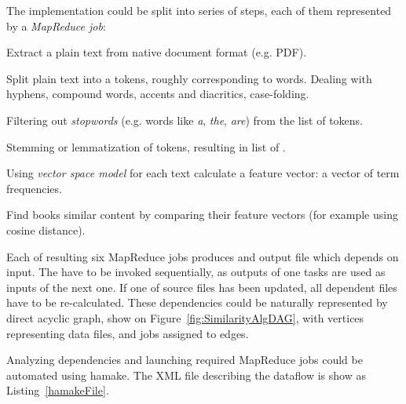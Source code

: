 \documentclass[10pt,conference,letterpaper]{IEEEtran}
\begin{document}
The implementation could be split into series of steps, each of them
represented by a \textit{MapReduce job}:

\begin{description}
\item[\emph{ExtractText}] Extract a plain text from native document format
  (e.g. PDF).
\item[\emph{Tokenize}] Split plain text into a tokens, roughly
  corresponding to words. Dealing with hyphens, compound words,
  accents and diacritics, case-folding.
\item[\emph{FilterStopwords}] Filtering out \textit{stopwords} (e.g. words
  like \textit{a}, \textit{the}, \textit{are}) from the list of
  tokens.
\item[\emph{Normalize}] Stemming or lemmatization of tokens,
  resulting in list of .
\item[\emph{CalculateTF}] Using \textit{vector space
    model}\cite{manning2008introduction} for each text calculate a
  feature vector: a vector of term frequencies.
\item[\emph{FindSimilar}] Find books similar content by comparing
  their feature vectors (for example using cosine
  distance\cite{wiki:cosinesimilarity}).
\end{description}

Each of resulting six MapReduce jobs produces and output file which
depends on input. The have to be invoked sequentially, as outputs of
one tasks are used as inputs of the next one. If one of source files
has been updated, all dependent files have to be re-calculated. These
dependencies could be naturally represented by direct acyclic graph,
show on Figure~\ref{fig:SimilarityAlgDAG}, with vertices representing
data files, and jobs assigned to edges.

Analyzing dependencies and launching required MapReduce jobs could be
automated using hamake. The XML file describing the dataflow is show
as Listing~\ref{hamakeFile}.
\end{document}

